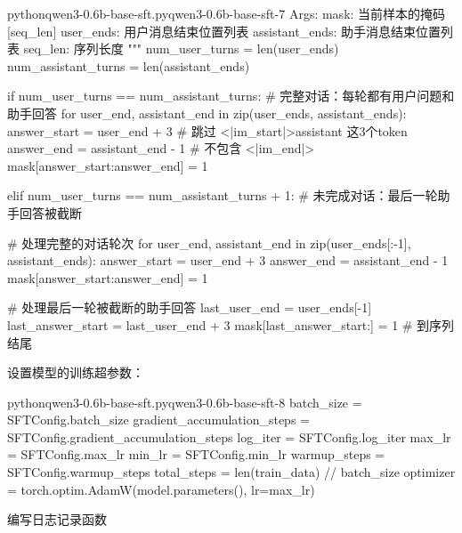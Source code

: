 \documentclass[lang=cn,newtx,10pt,scheme=chinese]{elegantbook}
\begin{document}
\begin{codebox}{python}{qwen3-0.6b-base-sft.py}{qwen3-0.6b-base-sft-7}
    Args:
        mask: 当前样本的掩码 [seq_len]
        user_ends: 用户消息结束位置列表
        assistant_ends: 助手消息结束位置列表
        seq_len: 序列长度
    """
    num_user_turns = len(user_ends)
    num_assistant_turns = len(assistant_ends)
    
    if num_user_turns == num_assistant_turns:
        # 完整对话：每轮都有用户问题和助手回答
        for user_end, assistant_end in zip(user_ends, assistant_ends):
            answer_start = user_end + 3  # 跳过 \n<|im_start|>assistant 这3个token
            answer_end = assistant_end - 1  # 不包含 <|im_end|>
            mask[answer_start:answer_end] = 1
            
    elif num_user_turns == num_assistant_turns + 1:
        # 未完成对话：最后一轮助手回答被截断
        
        # 处理完整的对话轮次
        for user_end, assistant_end in zip(user_ends[:-1], assistant_ends):
            answer_start = user_end + 3
            answer_end = assistant_end - 1
            mask[answer_start:answer_end] = 1
        
        # 处理最后一轮被截断的助手回答
        last_user_end = user_ends[-1]
        last_answer_start = last_user_end + 3
        mask[last_answer_start:] = 1  # 到序列结尾
\end{codebox}

设置模型的训练超参数：

\begin{codebox}{python}{qwen3-0.6b-base-sft.py}{qwen3-0.6b-base-sft-8}
batch_size = SFTConfig.batch_size
gradient_accumulation_steps = SFTConfig.gradient_accumulation_steps
log_iter = SFTConfig.log_iter
max_lr = SFTConfig.max_lr
min_lr = SFTConfig.min_lr
warmup_steps = SFTConfig.warmup_steps
total_steps = len(train_data) // batch_size
optimizer = torch.optim.AdamW(model.parameters(), lr=max_lr)
\end{codebox}

编写日志记录函数

\end{document}
